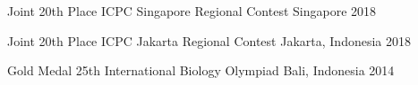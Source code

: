 

\begin{cvhonors}

  \cvhonor
    {Joint 20th Place} %
    {ICPC Singapore Regional Contest} %
    {Singapore} %
    {2018} %

  \cvhonor
    {Joint 20th Place} %
    {ICPC Jakarta Regional Contest} %
    {Jakarta, Indonesia} %
    {2018} %

  \cvhonor
    {Gold Medal} %
    {25th International Biology Olympiad} %
    {Bali, Indonesia} %
    {2014} %

\end{cvhonors}
